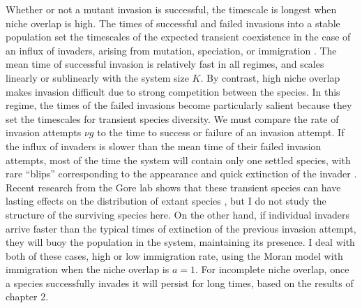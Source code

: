 Whether or not a mutant invasion is successful, the timescale is longest when niche overlap is high. %
The times of successful and failed invasions into a stable population set the timescales of the expected transient coexistence in the case of an influx of invaders, arising from mutation, speciation, or immigration \cite{Hubbell2001,Desai2007,Carroll2015}. 
The mean time of successful invasion is relatively fast in all regimes, and scales linearly or sublinearly with the system size $K$. 
By contrast, high niche overlap makes invasion difficult due to strong competition between the species. 
In this regime, the times of the failed invasions become particularly salient because they set the timescales for transient species diversity. %
We must compare the rate of invasion attempts $\nu g$ to the time to success or failure of an invasion attempt. 
If the influx of invaders is slower than the mean time of their failed invasion attempts, most of the time the system will contain only one settled species, with rare ``blips'' corresponding to the appearance and quick extinction of the invader \cite{Dias1996,Hubbell2001,Chesson2000}. 
Recent research from the Gore lab shows that these transient species can have lasting effects on the distribution of extant species \cite{Amor2019}, but I do not study the structure of the surviving species here. 
On the other hand, if individual invaders arrive faster than the typical times of extinction of the previous invasion attempt, they will buoy the population in the system, maintaining its presence. %
I deal with both of these cases, high or low immigration rate, using the Moran model with immigration when the niche overlap is $a=1$. 
For incomplete niche overlap, once a species successfully invades it will persist for long times, based on the results of chapter 2. 


